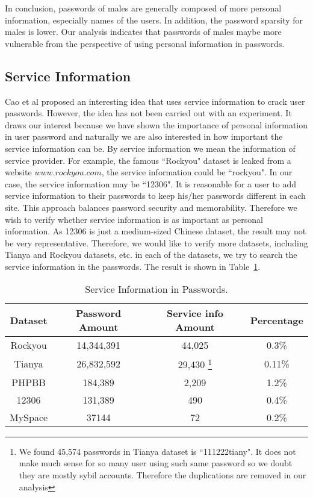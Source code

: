In conclusion, passwords of males are generally composed of more personal information, especially names of the users. In addition, the password sparsity for males is lower. Our analysis indicates that passwords of males maybe more vulnerable from the perspective of using personal information in passwords. 


\subsection{Service Information} 
Cao et al \cite{cao2014personalized} proposed an interesting idea that uses service information to crack user passwords. However, the idea has not been carried out with an experiment. It draws our interest because we have shown the importance of personal information in user password and naturally we are also interested in how important the service information can be. By service information we mean the information of service provider. For example, the famous ``Rockyou" dataset is leaked from a website $www.rockyou.com$, the service information could be ``rockyou". In our case, the service information may be ``12306". It is reasonable for a user to add service information to their passwords to keep his/her passwords different in each site. This approach balances password security and memorability. Therefore we wish to verify whether service information is as important as personal information. As 12306 is just a medium-sized Chinese dataset, the result may not be very representative. Therefore, we would like to verify more datasets, including Tianya and Rockyou datasets, etc. in each of the datasets, we try to search the service information in the passwords. The result is shown in Table~\ref{t7}.

\begin{table}[!]
\centering
\caption{Service Information in Passwords.}
\begin{adjustbox}{max width=0.48\textwidth}
\begin{tabular}{|c|c|c|c|} \hline
Dataset & Password Amount & Service info Amount & Percentage\\ \hline
Rockyou & 14,344,391 & 44,025 & 0.3\%\\ 
Tianya & 26,832,592 & 29,430{ \footnote{We found 45,574 passwords in Tianya dataset is ``111222tiany". It does not make much sense for so many user using such same password so we doubt they are mostly sybil accounts. Therefore the duplications are removed in our analysis} } &0.11\%\\ 
PHPBB & 184,389 & 2,209 & 1.2\%\\ 
12306 & 131,389 & 490 & 0.4\%\\ 
MySpace & 37144 & 72 & 0.2\%\\ 
\hline\end{tabular}
\end{adjustbox}
\label{t7}
\end{table}

